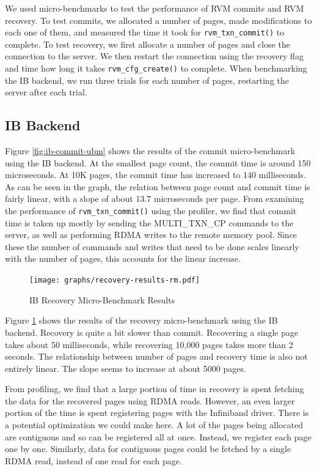 
We used micro-benchmarks to test the performance of RVM commits and RVM
recovery. To test commits, we allocated a number of pages, made modifications
to each one of them, and measured the time it took for \verb|rvm_txn_commit()|
to complete. To test recovery, we first allocate a number of pages and
close the connection to the server. We then restart the connection using the
recovery flag and time how long it takes \verb|rvm_cfg_create()| to complete.
When benchmarking the IB backend, we run three trials for each number of pages,
restarting the server after each trial.

\subsection{IB Backend}
Figure \ref{fig:ib-commit-ubm} shows the results of the commit micro-benchmark
using the IB backend. At the smallest page count, the commit time is around
150 microseconds. At 10K pages, the commit time has increased to 140 milliseconds.
As can be seen in the graph, the relation between page count and commit time
is fairly linear, with a slope of about 13.7 microseconds per page.
From examining the performance of \verb|rvm_txn_commit()| using the profiler,
we find that commit time is taken up mostly by sending the MULTI\_TXN\_CP
commands to the server, as well as performing RDMA writes to the remote memory pool.
Since these the number of commands and writes that need to be done scales
linearly with the number of pages, this accounts for the linear increase.


\begin{figure}[t!]
    \caption{IB Recovery Micro-Benchmark Results}
    \texttt{[image: graphs/recovery-results-rm.pdf]}
    \label{fig:ib-recovery-ubm}
\end{figure}

Figure \ref{fig:ib-recovery-ubm} shows the results of the recovery
micro-benchmark using the IB backend. Recovery is quite a bit slower than
commit. Recovering a single page takes about 50 milliseconds, while recovering
10,000 pages takes more than 2 seconds. The relationship between number of
pages and recovery time is also not entirely linear. The slope seems to
increase at about 5000 pages.

From profiling, we find that a large portion of time in recovery is spent
fetching the data for the recovered pages using RDMA reads. However, an even
larger portion of the time is spent registering pages with the Infiniband
driver. There is a potential optimization we could make here. A lot of the
pages being allocated are contiguous and so can be registered all at once.
Instead, we register each page one by one. Similarly, data for contiguous
pages could be fetched by a single RDMA read, instead of one read for each page.

